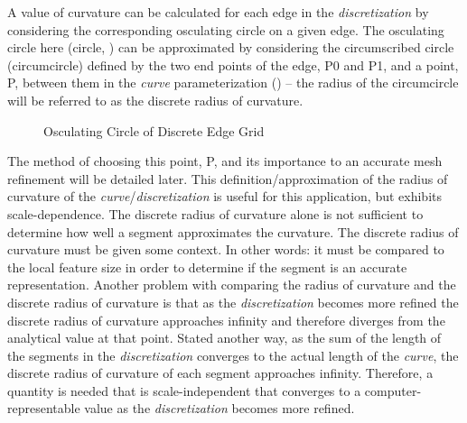 A value of curvature can be calculated for each edge in the \textit{discretization} by considering the corresponding osculating circle on a given edge. The osculating circle here (circle, ) can be approximated by considering the circumscribed circle (circumcircle) \cite{casey1888} defined by the two end points of the edge, P0 and P1, and a point, P, between them in the \textit{curve} parameterization () -- the radius of the circumcircle will be referred to as the discrete radius of curvature.

\begin{figure}[h!]
  \caption{\label{fig:CircumscribedCircle} Osculating Circle of Discrete Edge Grid}
\end{figure}

\noindent The method of choosing this point, P, and its importance to an accurate mesh refinement will be detailed later. This definition/approximation of the radius of curvature of the \textit{curve}/\textit{discretization} is useful for this application, but exhibits scale-dependence. The discrete radius of curvature alone is not sufficient to determine how well a segment approximates the curvature. The discrete radius of curvature must be given some context. In other words: it must be compared to the local feature size in order to determine if the segment is an accurate representation. Another problem with comparing the radius of curvature and the discrete radius of curvature is that as the \textit{discretization} becomes more refined the discrete radius of curvature approaches infinity and therefore diverges from the analytical value at that point. Stated another way, as the sum of the length of the segments in the \textit{discretization} converges to the actual length of the \textit{curve}, the discrete radius of curvature of each segment approaches infinity. Therefore, a quantity is needed that is scale-independent that converges to a computer-representable value as the \textit{discretization} becomes more refined.


